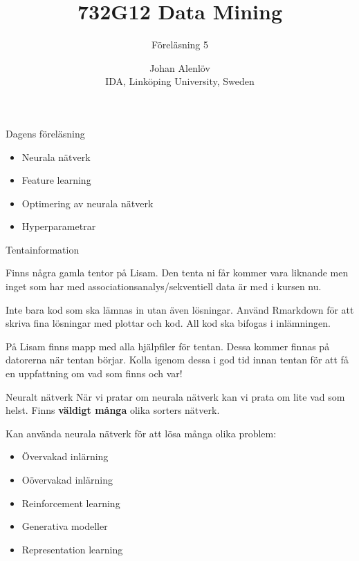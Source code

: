 \documentclass[10pt,english]{beamer}
\title{732G12 Data Mining}
\subtitle{Föreläsning 5}
\date{}
\author{Johan Alenlöv \\ IDA, Linköping University, Sweden}
\begin{document}
\maketitle

\begin{frame}{Dagens föreläsning}

    \begin{itemize}
        \item Neurala nätverk
        \item Feature learning
        \item Optimering av neurala nätverk
        \item Hyperparametrar
    \end{itemize}
    
\end{frame}

\begin{frame}{Tentainformation}
    
    Finns några gamla tentor på Lisam. Den tenta ni får kommer vara liknande men inget som har med associationsanalys/sekventiell data är med i kursen nu.

    Inte bara kod som ska lämnas in utan även lösningar. Använd Rmarkdown för att skriva fina lösningar med plottar och kod. All kod ska bifogas i inlämningen.

    På Lisam finns mapp med alla hjälpfiler för tentan. Dessa kommer finnas på datorerna när tentan börjar. Kolla igenom dessa i god tid innan tentan för att få en uppfattning om vad som finns och var!

\end{frame}

\begin{frame}{Neuralt nätverk}
    När vi pratar om neurala nätverk kan vi prata om lite vad som helst. Finns \textbf{väldigt många} olika sorters nätverk.

    Kan använda neurala nätverk för att lösa många olika problem:
    \begin{itemize}
        \item Övervakad inlärning
        \item Oövervakad inlärning
        \item Reinforcement learning
        \item Generativa modeller
        \item Representation learning
    \end{itemize}

\end{frame}
\end{document}
